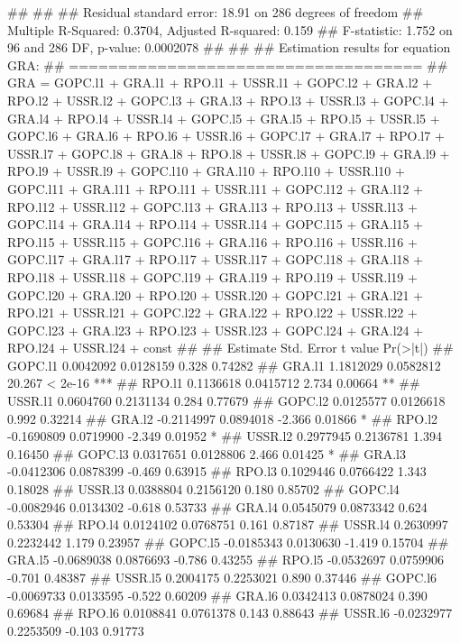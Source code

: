 \documentclass[
]{article}
\begin{document}
\begin{itemize}
## 
## 
## Residual standard error: 18.91 on 286 degrees of freedom
## Multiple R-Squared: 0.3704,  Adjusted R-squared: 0.159 
## F-statistic: 1.752 on 96 and 286 DF,  p-value: 0.0002078 
## 
## 
## Estimation results for equation GRA: 
## ==================================== 
## GRA = GOPC.l1 + GRA.l1 + RPO.l1 + USSR.l1 + GOPC.l2 + GRA.l2 + RPO.l2 + USSR.l2 + GOPC.l3 + GRA.l3 + RPO.l3 + USSR.l3 + GOPC.l4 + GRA.l4 + RPO.l4 + USSR.l4 + GOPC.l5 + GRA.l5 + RPO.l5 + USSR.l5 + GOPC.l6 + GRA.l6 + RPO.l6 + USSR.l6 + GOPC.l7 + GRA.l7 + RPO.l7 + USSR.l7 + GOPC.l8 + GRA.l8 + RPO.l8 + USSR.l8 + GOPC.l9 + GRA.l9 + RPO.l9 + USSR.l9 + GOPC.l10 + GRA.l10 + RPO.l10 + USSR.l10 + GOPC.l11 + GRA.l11 + RPO.l11 + USSR.l11 + GOPC.l12 + GRA.l12 + RPO.l12 + USSR.l12 + GOPC.l13 + GRA.l13 + RPO.l13 + USSR.l13 + GOPC.l14 + GRA.l14 + RPO.l14 + USSR.l14 + GOPC.l15 + GRA.l15 + RPO.l15 + USSR.l15 + GOPC.l16 + GRA.l16 + RPO.l16 + USSR.l16 + GOPC.l17 + GRA.l17 + RPO.l17 + USSR.l17 + GOPC.l18 + GRA.l18 + RPO.l18 + USSR.l18 + GOPC.l19 + GRA.l19 + RPO.l19 + USSR.l19 + GOPC.l20 + GRA.l20 + RPO.l20 + USSR.l20 + GOPC.l21 + GRA.l21 + RPO.l21 + USSR.l21 + GOPC.l22 + GRA.l22 + RPO.l22 + USSR.l22 + GOPC.l23 + GRA.l23 + RPO.l23 + USSR.l23 + GOPC.l24 + GRA.l24 + RPO.l24 + USSR.l24 + const 
## 
##            Estimate Std. Error t value Pr(>|t|)    
## GOPC.l1   0.0042092  0.0128159   0.328  0.74282    
## GRA.l1    1.1812029  0.0582812  20.267  < 2e-16 ***
## RPO.l1    0.1136618  0.0415712   2.734  0.00664 ** 
## USSR.l1   0.0604760  0.2131134   0.284  0.77679    
## GOPC.l2   0.0125577  0.0126618   0.992  0.32214    
## GRA.l2   -0.2114997  0.0894018  -2.366  0.01866 *  
## RPO.l2   -0.1690809  0.0719900  -2.349  0.01952 *  
## USSR.l2   0.2977945  0.2136781   1.394  0.16450    
## GOPC.l3   0.0317651  0.0128806   2.466  0.01425 *  
## GRA.l3   -0.0412306  0.0878399  -0.469  0.63915    
## RPO.l3    0.1029446  0.0766422   1.343  0.18028    
## USSR.l3   0.0388804  0.2156120   0.180  0.85702    
## GOPC.l4  -0.0082946  0.0134302  -0.618  0.53733    
## GRA.l4    0.0545079  0.0873342   0.624  0.53304    
## RPO.l4    0.0124102  0.0768751   0.161  0.87187    
## USSR.l4   0.2630997  0.2232442   1.179  0.23957    
## GOPC.l5  -0.0185343  0.0130630  -1.419  0.15704    
## GRA.l5   -0.0689038  0.0876693  -0.786  0.43255    
## RPO.l5   -0.0532697  0.0759906  -0.701  0.48387    
## USSR.l5   0.2004175  0.2253021   0.890  0.37446    
## GOPC.l6  -0.0069733  0.0133595  -0.522  0.60209    
## GRA.l6    0.0342413  0.0878024   0.390  0.69684    
## RPO.l6    0.0108841  0.0761378   0.143  0.88643    
## USSR.l6  -0.0232977  0.2253509  -0.103  0.91773    

\end{itemize}
\end{document}
